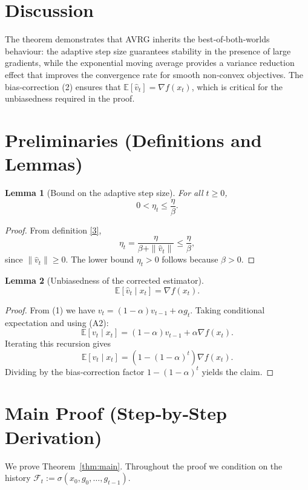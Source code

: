 \documentclass{article}
\newtheorem{lemma}{Lemma}
\newcommand{\E}{\mathbb{E}}
\begin{document}
\section*{Discussion}
The theorem demonstrates that AVRG inherits the best‑of‑both‑worlds
behaviour: the adaptive step size guarantees stability in the presence of
large gradients, while the exponential moving average provides a variance
reduction effect that improves the convergence rate for smooth non‑convex
objectives. The bias‑correction (2) ensures that $ \E[\hat v_t]=\nabla f(x_t)$,
which is critical for the unbiasedness required in the proof.

\newpage
\section*{Preliminaries (Definitions and Lemmas)}
\begin{lemma}[Bound on the adaptive step size]\label{lem:bound-eta}
For all $t\ge0$,
\[
0<\eta_t\le \frac{\eta}{\beta}.
\]
\end{lemma}
\begin{proof}
From definition \eqref{3},
\[
\eta_t=\frac{\eta}{\beta+\|\hat v_t\|}\le\frac{\eta}{\beta},
\]
since $\|\hat v_t\|\ge0$. The lower bound $\eta_t>0$ follows because $\beta>0$.
\end{proof}

\begin{lemma}[Unbiasedness of the corrected estimator]\label{lem:unbiased}
\[
\E[\hat v_t\mid x_t]=\nabla f(x_t).
\]
\end{lemma}
\begin{proof}
From (1) we have $v_t=(1-\alpha)v_{t-1}+\alpha g_t$.
Taking conditional expectation and using (A2):
\[
\E[v_t\mid x_t]=(1-\alpha)v_{t-1}+\alpha\nabla f(x_t).
\]
Iterating this recursion gives
\[
\E[v_t\mid x_t]=(1-(1-\alpha)^{t})\nabla f(x_t).
\]
Dividing by the bias‑correction factor $1-(1-\alpha)^{t}$ yields the claim.
\end{proof}

\section*{Main Proof (Step‑by‑Step Derivation)}
We prove Theorem~\ref{thm:main}. Throughout the proof we condition on the
history $\mathcal{F}_t:=\sigma(x_0,g_0,\dots,g_{t-1})$.
\end{document}
